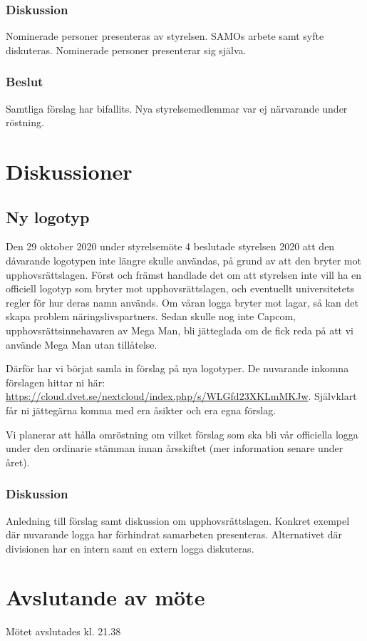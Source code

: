 \documentclass[protokoll]{dvd}
\begin{document}
\subsubsection{Diskussion}
Nominerade personer presenteras av styrelsen. SAMOs arbete samt syfte diskuteras. Nominerade personer presenterar sig själva.

\subsubsection{Beslut}
\begin{attsatser}
	\item Samtliga förslag har bifallits. Nya styrelsemedlemmar var ej närvarande under röstning.
\end{attsatser}


\newpage
\section{Diskussioner}\label{sec:discussioner}

\subsection{Ny logotyp}

Den 29 oktober 2020 under styrelsemöte 4 beslutade styrelsen 2020 att den dåvarande logotypen inte längre skulle användas, på grund av att den bryter mot upphovsrättslagen.
Först och främst handlade det om att styrelsen inte vill ha en officiell logotyp som bryter mot upphovsrättslagen, och eventuellt universitetets regler för hur deras namn används.
Om våran logga bryter mot lagar, så kan det skapa problem näringslivspartners.
Sedan skulle nog inte Capcom, upphovsrättsinnehavaren av Mega Man, bli jätteglada om de fick reda på att vi använde Mega Man utan tillåtelse.

Därför har vi börjat samla in förslag på nya logotyper.
De nuvarande inkomna förslagen hittar ni här: \url{https://cloud.dvet.se/nextcloud/index.php/s/WLGfd23XKLmMKJw}.
Självklart får ni jättegärna komma med era åsikter och era egna förslag.

Vi planerar att hålla omröstning om vilket förslag som ska bli vår officiella logga under den ordinarie stämman innan årsskiftet (mer information senare under året).

\subsubsection{Diskussion}
Anledning till förslag samt diskussion om upphovsrättslagen. Konkret exempel där nuvarande logga har förhindrat samarbeten presenteras. Alternativet där divisionen har en intern samt en extern logga diskuteras. 

\section{Avslutande av möte}

Mötet avslutades kl. 21.38

\end{document}
